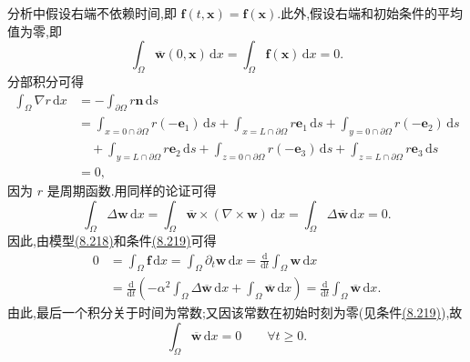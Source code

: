 \begin{note}[假设及其推论]
\label{note:navier-stokes-alpha-assumptions}
分析中假设右端不依赖时间,即 $\bm{f}(t,\bm{x})=\bm{f}(\bm{x})$.此外,假设右端和初始条件的平均值为零,即
\begin{equation}\label{eq:navier-stokes-alpha-zero-mean}
 \int_\Omega\overline{\bm{w}}(0,\bm{x})\,\mathrm{d}x
 =\int_\Omega\bm{f}(\bm{x})\,\mathrm{d}x=0.
\end{equation}
分部积分可得
\[
\begin{aligned}
 \int_\Omega\nabla r\,\mathrm{d}x
 &=-\int_{\partial\Omega}r\bm{n}\,\mathrm{d}s\\
 &=\int_{x=0\cap\partial\Omega}r(-\bm{e}_1)\,\mathrm{d}s
   +\int_{x=L\cap\partial\Omega}r\bm{e}_1\,\mathrm{d}s
   +\int_{y=0\cap\partial\Omega}r(-\bm{e}_2)\,\mathrm{d}s\\
 &\quad+\int_{y=L\cap\partial\Omega}r\bm{e}_2\,\mathrm{d}s
   +\int_{z=0\cap\partial\Omega}r(-\bm{e}_3)\,\mathrm{d}s
   +\int_{z=L\cap\partial\Omega}r\bm{e}_3\,\mathrm{d}s\\
 &=0,
\end{aligned}
\]
因为 $r$ 是周期函数.用同样的论证可得
\[
 \int_\Omega\Delta\bm{w}\,\mathrm{d}x
 =\int_\Omega\overline{\bm{w}}\times
       (\nabla\times\bm{w})\,\mathrm{d}x
 =\int_\Omega\Delta\overline{\bm{w}}\,\mathrm{d}x=0.
\]
因此,由模型\hyperref[eq:navier-stokes-alpha-periodic-model]{(8.218)}和条件\hyperref[eq:navier-stokes-alpha-zero-mean]{(8.219)}可得
\[
\begin{aligned}
 0&=\int_\Omega\bm{f}\,\mathrm{d}x
   =\int_\Omega\partial_t\bm{w}\,\mathrm{d}x
   =\frac{\mathrm{d}}{\mathrm{d}t}\int_\Omega\bm{w}\,\mathrm{d}x\\
  &=\frac{\mathrm{d}}{\mathrm{d}t}
    \left(-\alpha^2\int_\Omega\Delta\overline{\bm{w}}\,\mathrm{d}x
          +\int_\Omega\overline{\bm{w}}\,\mathrm{d}x\right)
   =\frac{\mathrm{d}}{\mathrm{d}t}
      \int_\Omega\overline{\bm{w}}\,\mathrm{d}x.
\end{aligned}
\]
由此,最后一个积分关于时间为常数;又因该常数在初始时刻为零(见条件\hyperref[eq:navier-stokes-alpha-zero-mean]{(8.219)}),故
\[
 \int_\Omega\overline{\bm{w}}\,\mathrm{d}x=0
 \qquad\forall t\ge0.
\]
\end{note}

